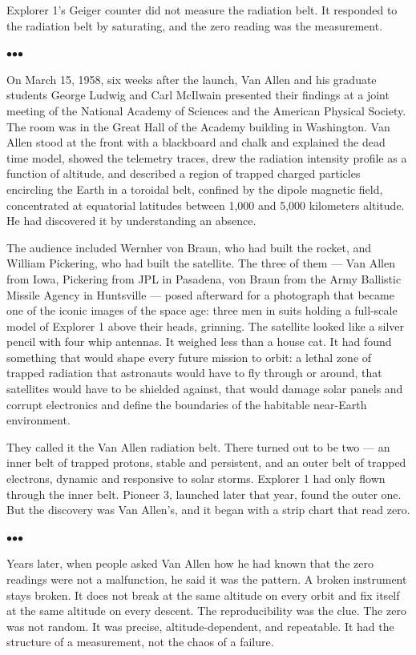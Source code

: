 \documentclass[12pt, letterpaper]{article}
\begin{document}
Explorer 1's Geiger counter did not measure the radiation belt. It responded to the radiation belt by saturating, and the zero reading was the measurement.

\bigskip
\centerline{$\bullet$\quad$\bullet$\quad$\bullet$}
\bigskip

On March 15, 1958, six weeks after the launch, Van Allen and his graduate students George Ludwig and Carl McIlwain presented their findings at a joint meeting of the National Academy of Sciences and the American Physical Society. The room was in the Great Hall of the Academy building in Washington. Van Allen stood at the front with a blackboard and chalk and explained the dead time model, showed the telemetry traces, drew the radiation intensity profile as a function of altitude, and described a region of trapped charged particles encircling the Earth in a toroidal belt, confined by the dipole magnetic field, concentrated at equatorial latitudes between 1,000 and 5,000 kilometers altitude. He had discovered it by understanding an absence.

The audience included Wernher von Braun, who had built the rocket, and William Pickering, who had built the satellite. The three of them --- Van Allen from Iowa, Pickering from JPL in Pasadena, von Braun from the Army Ballistic Missile Agency in Huntsville --- posed afterward for a photograph that became one of the iconic images of the space age: three men in suits holding a full-scale model of Explorer 1 above their heads, grinning. The satellite looked like a silver pencil with four whip antennas. It weighed less than a house cat. It had found something that would shape every future mission to orbit: a lethal zone of trapped radiation that astronauts would have to fly through or around, that satellites would have to be shielded against, that would damage solar panels and corrupt electronics and define the boundaries of the habitable near-Earth environment.

They called it the Van Allen radiation belt. There turned out to be two --- an inner belt of trapped protons, stable and persistent, and an outer belt of trapped electrons, dynamic and responsive to solar storms. Explorer 1 had only flown through the inner belt. Pioneer 3, launched later that year, found the outer one. But the discovery was Van Allen's, and it began with a strip chart that read zero.

\bigskip
\centerline{$\bullet$\quad$\bullet$\quad$\bullet$}
\bigskip

Years later, when people asked Van Allen how he had known that the zero readings were not a malfunction, he said it was the pattern. A broken instrument stays broken. It does not break at the same altitude on every orbit and fix itself at the same altitude on every descent. The reproducibility was the clue. The zero was not random. It was precise, altitude-dependent, and repeatable. It had the structure of a measurement, not the chaos of a failure.
\end{document}
